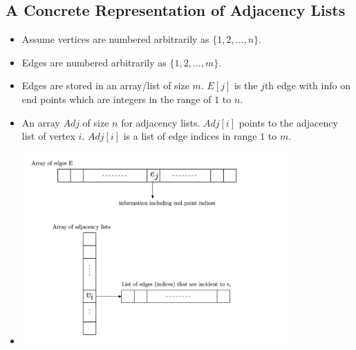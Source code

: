 \subsection{A Concrete Representation of Adjacency Lists}
\begin{itemize}
    \item Assume vertices are numbered arbitrarily as $\{ 1, 2, ..., n \}$.
    \item Edges are numbered arbitrarily as $\{ 1, 2, ..., m \}$.
    \item Edges are stored in an array/list of size $m$. $E[j]$ is the $j$th edge with info on end points which are integers in the range of $1$ to $n$.
    \item An array $Adj$ of size $n$ for adjacency lists. $Adj[i]$ points to the adjacency list of vertex $i$. $Adj[i]$ is a list of edge indices in range $1$ to $m$.
    \item[] \includegraphics[width=0.8\textwidth]{lecture15/images/adjacency-list-representation.jpg}
\end{itemize}

